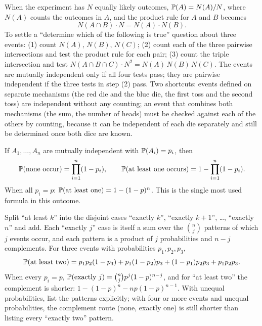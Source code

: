 \begin{keyfact}
When the experiment has $N$ equally likely outcomes, $\mathbb{P}(A) = N(A)/N$, where $N(A)$ counts the outcomes in $A$, and the product rule for $A$ and $B$ becomes
\[
N(A \cap B)\cdot N = N(A)\cdot N(B).
\]
To settle a ``determine which of the following is true'' question about three events: (1) count $N(A)$, $N(B)$, $N(C)$; (2) count each of the three pairwise intersections and test the product rule for each pair; (3) count the triple intersection and test $N(A \cap B \cap C)\cdot N^2 = N(A)\,N(B)\,N(C)$. The events are mutually independent only if all four tests pass; they are pairwise independent if the three tests in step (2) pass. Two shortcuts: events defined on separate mechanisms (the red die and the blue die, the first toss and the second toss) are independent without any counting; an event that combines both mechanisms (the sum, the number of heads) must be checked against each of the others by counting, because it can be independent of each die separately and still be determined once both dice are known.
\end{keyfact}

\begin{keyfact}
If $A_1, \dots, A_n$ are mutually independent with $\mathbb{P}(A_i) = p_i$, then
\[
\mathbb{P}(\text{none occur}) = \prod_{i=1}^{n} (1 - p_i), \qquad
\mathbb{P}(\text{at least one occurs}) = 1 - \prod_{i=1}^{n} (1 - p_i).
\]
When all $p_i = p$: $\mathbb{P}(\text{at least one}) = 1 - (1-p)^n$. This is the single most used formula in this outcome.
\end{keyfact}

\begin{keyfact}
Split ``at least $k$'' into the disjoint cases ``exactly $k$'', ``exactly $k+1$'', \dots, ``exactly $n$'' and add. Each ``exactly $j$'' case is itself a sum over the $\binom{n}{j}$ patterns of which $j$ events occur, and each pattern is a product of $j$ probabilities and $n - j$ complements. For three events with probabilities $p_1, p_2, p_3$,
\[
\mathbb{P}(\text{at least two}) = p_1 p_2 (1-p_3) + p_1 (1-p_2) p_3 + (1-p_1) p_2 p_3 + p_1 p_2 p_3 .
\]
When every $p_i = p$, $\mathbb{P}(\text{exactly } j) = \binom{n}{j} p^j (1-p)^{n-j}$, and for ``at least two'' the complement is shorter: $1 - (1-p)^n - np(1-p)^{n-1}$. With unequal probabilities, list the patterns explicitly; with four or more events and unequal probabilities, the complement route (none, exactly one) is still shorter than listing every ``exactly two'' pattern.
\end{keyfact}

